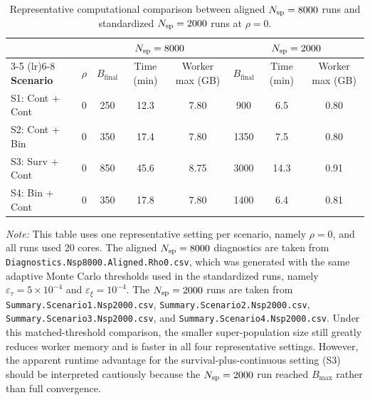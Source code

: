 \begin{table}[ht!]
\centering
\caption{Representative computational comparison between aligned $N_{\textup{sp}}=8000$ runs and standardized $N_{\textup{sp}}=2000$ runs at $\rho=0$.}
\label{tab:nsp8000_vs_2000_rho0}
\setlength{\tabcolsep}{3.5pt}
\footnotesize
\begin{tabular}{@{}l c ccc ccc@{}}
\toprule
& & \multicolumn{3}{c}{$N_{\textup{sp}}=8000$} & \multicolumn{3}{c}{$N_{\textup{sp}}=2000$} \\
\cmidrule(lr){3-5} \cmidrule(lr){6-8}
\textbf{Scenario} & $\rho$ & $B_{\text{final}}$ & Time (min) & Worker max (GB) & $B_{\text{final}}$ & Time (min) & Worker max (GB) \\
\midrule
S1: Cont + Cont & 0 & 250 & 12.3 & 7.80 & 900 & 6.5 & 0.80 \\
S2: Cont + Bin & 0 & 350 & 17.4 & 7.80 & 1350 & 7.5 & 0.80 \\
S3: Surv + Cont & 0 & 850 & 45.6 & 8.75 & 3000 & 14.3 & 0.91 \\
S4: Bin + Cont & 0 & 350 & 17.8 & 7.80 & 1400 & 6.4 & 0.81 \\
\bottomrule
\end{tabular}
\parbox{0.92\textwidth}{\footnotesize \textit{Note:} This table uses one representative setting per scenario, namely $\rho=0$, and all runs used 20 cores. The aligned $N_{\textup{sp}}=8000$ diagnostics are taken from \texttt{Diagnostics.Nsp8000.Aligned.Rho0.csv}, which was generated with the same adaptive Monte Carlo thresholds used in the standardized runs, namely $\varepsilon_{\tau}=5\times 10^{-4}$ and $\varepsilon_{\xi}=10^{-4}$. The $N_{\textup{sp}}=2000$ runs are taken from \texttt{Summary.Scenario1.Nsp2000.csv}, \texttt{Summary.Scenario2.Nsp2000.csv}, \texttt{Summary.Scenario3.Nsp2000.csv}, and \texttt{Summary.Scenario4.Nsp2000.csv}. Under this matched-threshold comparison, the smaller super-population size still greatly reduces worker memory and is faster in all four representative settings. However, the apparent runtime advantage for the survival-plus-continuous setting (S3) should be interpreted cautiously because the $N_{\textup{sp}}=2000$ run reached $B_{\max}$ rather than full convergence.}
\end{table}

